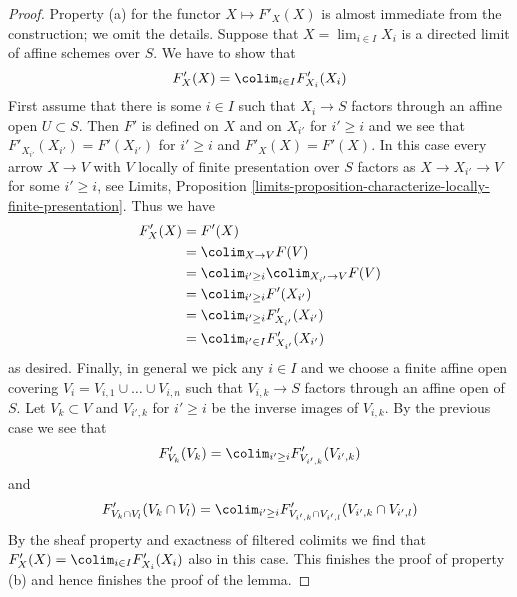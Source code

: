 \begin{proof}
\medskip\noindent
Property (a) for the functor $X \mapsto F'_X(X)$ is almost immediate
from the construction; we omit the details.
Suppose that $X = \lim_{i \in I} X_i$
is a directed limit of affine schemes over $S$. We have to show that
$$
F'_X(X) = \colim_{i \in I} F'_{X_i}(X_i)
$$
First assume that there is some $i \in I$ such that
$X_i \to S$ factors through an affine open $U \subset S$.
Then $F'$ is defined on $X$ and on $X_{i'}$ for $i' \geq i$
and we see that $F'_{X_{i'}}(X_{i'}) = F'(X_{i'})$ for
$i' \geq i$ and $F'_X(X) = F'(X)$. In this case every arrow
$X \to V$ with $V$ locally of finite presentation
over $S$ factors as $X \to X_{i'} \to V$ for some
$i' \geq i$, see Limits, Proposition
\ref{limits-proposition-characterize-locally-finite-presentation}.
Thus we have
\begin{align*}
F'_X(X)
& =
F'(X)  \\
& = \colim_{X \to V} F(V) \\
& =
\colim_{i' \geq i} \colim_{X_{i'} \to V} F(V) \\
& =
\colim_{i' \geq i} F'(X_{i'}) \\
& =
\colim_{i' \geq i} F'_{X_{i'}}(X_{i'}) \\
& =
\colim_{i' \in I} F'_{X_{i'}}(X_{i'})
\end{align*}
as desired. Finally, in general we pick any $i \in I$ and we choose
a finite affine open covering $V_i = V_{i, 1} \cup \ldots \cup V_{i, n}$
such that $V_{i, k} \to S$ factors through an affine open of $S$.
Let $V_k \subset V$ and $V_{i', k}$ for $i' \geq i$
be the inverse images of $V_{i, k}$.
By the previous case we see that
$$
F'_{V_k}(V_k) = \colim_{i' \geq i} F'_{V_{i', k}}(V_{i', k})
$$
and
$$
F'_{V_k \cap V_l}(V_k \cap V_l) =
\colim_{i' \geq i}
F'_{V_{i', k} \cap V_{i', l}}(V_{i', k} \cap V_{i', l})
$$
By the sheaf property and exactness of filtered colimits
we find that $F'_X(X) = \colim_{i \in I} F'_{X_i}(X_i)$
also in this case. This finishes the proof of property (b)
and hence finishes the proof of the lemma.
\end{proof}

